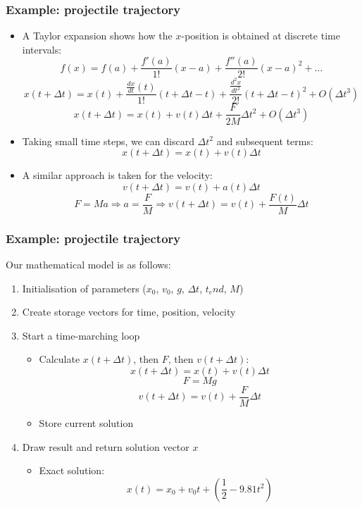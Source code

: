 \documentclass[11pt,table,final,fleqn,xcolor={usenames,dvipsnames}]{beamer}
\begin{document}
\begin{frame}[fragile]
\scriptsize\selectfont
  \frametitle{Example: projectile trajectory}
  \begin{itemize}
    \item A Taylor expansion shows how the $x$-position is obtained at discrete time intervals: 
    \[ f(x) = f(a) + \frac{f'(a)}{1!}(x-a) + \frac{f''(a)}{2!}(x-a)^2  + \ldots \]\pause
    \[ x(t+\Delta t) = x(t) + \frac{\frac{dx}{dt}(t)}{1!}(t + \Delta t - t) + \frac{\frac{d^2x}{dt^2}}{2!}(t+\Delta t - t)^2  + O(\Delta t^3) \] \pause
    \[ x(t+\Delta t) = x(t) + v(t)\Delta t + \frac{F}{2M}\Delta t^2  + O(\Delta t^3) \] \pause
    \item Taking small time steps, we can discard $\Delta t^2$ and subsequent terms:
    \[ x(t+\Delta t) = x(t) + v(t)\Delta t \] \pause
    \item A similar approach is taken for the velocity:
    \[ v(t+\Delta t) = v(t) + a(t)\Delta t \] \pause
    \[ F = Ma \Rightarrow a = \frac{F}{M} \Rightarrow v(t+\Delta t) = v(t) + \frac{F(t)}{M}\Delta t \]
  \end{itemize}
\end{frame}

\begin{frame}[fragile]
\scriptsize\selectfont
  \frametitle{Example: projectile trajectory}
  Our mathematical model is as follows: \pause
  \begin{enumerate}
    \item Initialisation of parameters ($x_0$, $v_0$, $g$, $\Delta t$, $t_end$, $M$)\pause
    \item Create storage vectors for time, position, velocity \pause
    \item Start a time-marching loop \pause
    \begin{itemize}
    \scriptsize\selectfont
      \item Calculate $x(t+\Delta t)$, then $F$, then $v(t+\Delta t)$:
      \[ x(t+\Delta t) = x(t) + v(t)\Delta t \] 
      \[ F = Mg \]
      \[ v(t+\Delta t) = v(t) + \frac{F}{M}\Delta t \] \pause
      \item Store current solution
    \end{itemize}
    \item Draw result and return solution vector $x$
    \begin{itemize}
      \item Exact solution:
      \[
        x(t) = x_0 + v_0 t + ( \frac{1}{2} -9.81 t^2 )
      \]
    \end{itemize}
  \end{enumerate}
\end{frame}
\end{document}
